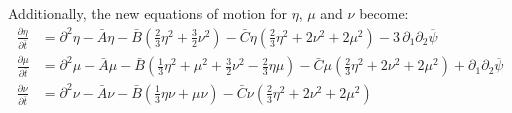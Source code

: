 \documentclass[reqno]{article}
\begin{document}
	Additionally, the new equations of motion for $\eta$, $\mu$ and $\nu$ become:
	\begin{equation}\label{eq:dimensionless-flow-eoms}
	\begin{split}
		\frac{\partial \eta}{\partial \bar{t}} &= \partial^2 \eta - \bar{A}\eta - \bar{B}\left( \tfrac 23 \eta^2 + \tfrac 32 \nu^2\right) - \bar{C} \eta \left( \tfrac23 \eta^2 + 2\nu^2 + 2\mu^2\right) - 3\,\partial_1 \partial_2 \overline{\psi} \\
		\frac{\partial \mu}{\partial \bar{t}} &= \partial^2 \mu - \bar{A}\mu - \bar{B}\left( \tfrac13 \eta^2 + \mu^2 + \tfrac32 \nu^2 - \tfrac23 \eta \mu \right) - \bar{C}\mu\left(\tfrac23 \eta^2 + 2\nu^2 + 2\mu^2\right) + \partial_1 \partial_2 \overline{\psi} \\
		\frac{\partial \nu}{\partial \bar{t}} &= \partial^2 \nu - \bar{A}\nu - \bar{B}\left( \tfrac13\eta\nu + \mu\nu \right) - \bar{C}\nu\left(\tfrac23\eta^2 + 2\nu^2 + 2\mu^2\right)
	\end{split}
	\end{equation}
	
\end{document}
